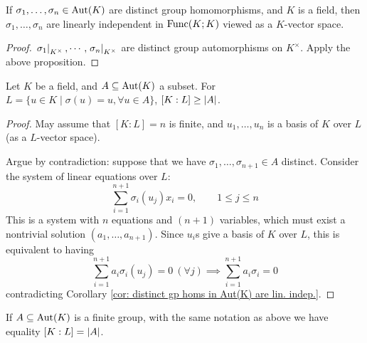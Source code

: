 \begin{corollary}\label{cor: distinct gp homs in Aut(K) are lin. indep.}
    If $\sigma_1, \dots, \sigma_n \in \mathrm{Aut}(K)$ are distinct group homomorphisms, and $K$ is a field, then $\sigma_1, \dots, \sigma_n$ are linearly independent in $\mathrm{Func}(K; K)$ viewed as a $K$-vector space.
\end{corollary}

\begin{proof}
    $\left.\sigma_1\right|_{K^{\times}}, \cdots, \left.\sigma_n\right|_{K^{\times}}$ are distinct group automorphisms on $K^{\times}$. Apply the above proposition.
\end{proof}

\begin{proposition}
    Let $K$ be a field, and $A \subseteq \mathrm{Aut}(K)$ a subset. For $L = \{u \in K \mid \sigma(u) = u, \forall u \in A\}$, $[K : L] \geq \left|A\right|$.
\end{proposition}

\begin{proof}
    May assume that $[K : L] = n$ is finite, and $u_1, \dots, u_n$ is a basis of $K$ over $L$ (as a $L$-vector space). 

    Argue by contradiction: suppose that we have $\sigma_1, \dots, \sigma_{n+1} \in A$ distinct. Consider the system of linear equations over $L$:
    \[
        \sum_{i = 1}^{n+1} \sigma_i(u_j) x_i = 0, \qquad 1 \leq j \leq n
    \]
    This is a system with $n$ equations and $(n+1)$ variables, which must exist a nontrivial solution $(a_1, \dots, a_{n+1})$. Since $u_i$s give a basis of $K$ over $L$, this is equivalent to having
    \[
        \sum_{i = 1}^{n+1} a_i \sigma_i(u_j) = 0\ (\forall j) \implies \sum_{i = 1}^{n+1} a_i \sigma_i = 0
    \]
    contradicting Corollary \ref{cor: distinct gp homs in Aut(K) are lin. indep.}.
\end{proof}

\begin{proposition}\label{prop: degree of subext equals order of galois subgroup}
    If $A \subseteq \mathrm{Aut}(K)$ is a finite group, with the same notation as above we have equality $[K : L] = \left|A\right|$.
\end{proposition}

